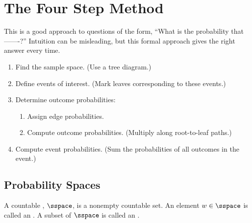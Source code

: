 \documentclass[handout]{mcs}
\begin{document}






\appendix
\section{The Four Step Method}

This is a good approach to questions of the form, ``What is the
probability that -------?''  Intuition can be misleading, but
this formal approach gives the right answer every time.

\begin{enumerate}
\item Find the sample space.  (Use a tree diagram.)

\item Define events of interest.  (Mark leaves corresponding to these
events.)

\item Determine outcome probabilities:

\begin{enumerate}

\item Assign edge probabilities.

\item Compute outcome probabilities.  (Multiply along root-to-leaf
paths.)

\end{enumerate}

\item Compute event probabilities.  (Sum the probabilities of all
outcomes in the event.)

\end{enumerate}

\iffalse
\subsection{Probability Spaces}

  A countable , $\sspace$, is a nonempty countable set.
  An element $w \in \sspace$ is called an .  A subset of
  $\sspace$ is called an .
\end{document}
